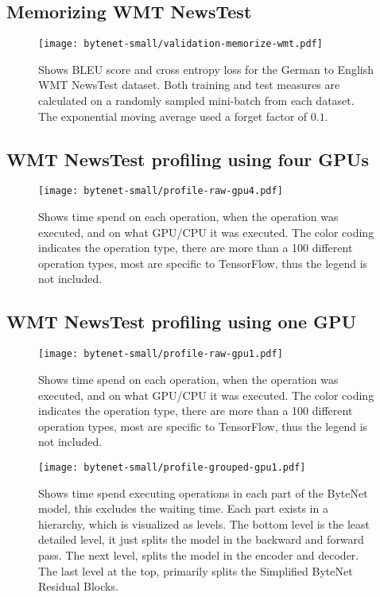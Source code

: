 \subsection{Memorizing WMT NewsTest}
\begin{figure}[h]
    \centering
    \texttt{[image: bytenet-small/validation-memorize-wmt.pdf]}
    \caption{Shows BLEU score and cross entropy loss for the German to English WMT NewsTest dataset. Both training and test measures are calculated on a randomly sampled mini-batch from each dataset. The exponential moving average used a forget factor of $0.1$.}
\end{figure}
\clearpage

\subsection{WMT NewsTest profiling using four GPUs}
\begin{figure}[h]
    \centering
    \texttt{[image: bytenet-small/profile-raw-gpu4.pdf]}
    \caption{Shows time spend on each operation, when the operation was executed, and on what GPU/CPU it was executed. The color coding indicates the operation type, there are more than a 100 different operation types, most are specific to TensorFlow, thus the legend is not included.}
    \label{fig:result:bytenet:profile-raw}
\end{figure}
\clearpage


\subsection{WMT NewsTest profiling using one GPU}
\begin{figure}[h]
    \centering
    \texttt{[image: bytenet-small/profile-raw-gpu1.pdf]}
    \caption{Shows time spend on each operation, when the operation was executed, and on what GPU/CPU it was executed. The color coding indicates the operation type, there are more than a 100 different operation types, most are specific to TensorFlow, thus the legend is not included.}
\end{figure}

\begin{figure}[h]
    \centering
    \texttt{[image: bytenet-small/profile-grouped-gpu1.pdf]}
    \caption{Shows time spend executing operations in each part of the ByteNet model, this excludes the waiting time. Each part exists in a hierarchy, which is visualized as levels. The bottom level is the least detailed level, it just splits the model in the backward and forward pass. The next level, splits the model in the encoder and decoder. The last level at the top, primarily splits the Simplified ByteNet Residual Blocks.}
\end{figure}
